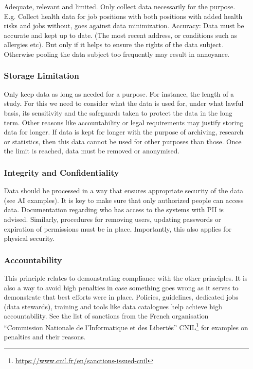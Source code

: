 \documentclass[
  12pt,
]{book}
\DeclareRobustCommand{\href}[2]{#2\footnote{\url{#1}}}
\begin{document}
Adequate, relevant and limited. Only collect data necessarily for the purpose. E.g. Collect health data for job positions with both positions with added health risks and jobs without, goes against data minimization.
Accuracy: Data must be accurate and kept up to date. (The most recent address, or conditions such as allergies etc). But only if it helps to ensure the rights of the data subject. Otherwise pooling the data subject too frequently may result in annoyance.

\subsubsection{Storage Limitation}\label{storage-limitation}

Only keep data as long as needed for a purpose. For instance, the length of a study. For this we need to consider what the data is used for, under what lawful basis, its sensitivity and the safeguards taken to protect the data in the long term. Other reasons like accountability or legal requirements may justify storing data for longer. If data is kept for longer with the purpose of archiving, research or statistics, then this data cannot be used for other purposes than those. Once the limit is reached, data must be removed or anonymised.

\subsubsection{Integrity and Confidentiality}\label{integrity-and-confidentiality}

Data should be processed in a way that ensures appropriate security of the data (see AI examples). It is key to make sure that only authorized people can access data. Documentation regarding who has access to the systems with PII is advised. Similarly, procedures for removing users, updating passwords or expiration of permissions must be in place. Importantly, this also applies for physical security.

\subsubsection{Accountability}\label{accountability}

This principle relates to demonstrating compliance with the other principles. It is also a way to avoid high penalties in case something goes wrong as it serves to demonstrate that best efforts were in place. Policies, guidelines, dedicated jobs (data stewards), training and tools like data catalogues help achieve high accountability. See the list of sanctions from the French organisation ``Commission Nationale de l'Informatique et des Libertés'' \href{https://www.cnil.fr/en/sanctions-issued-cnil}{CNIL} for examples on penalties and their reasons.
\end{document}
